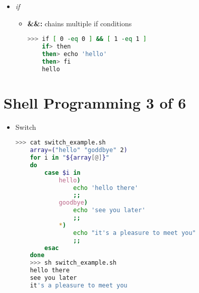 \documentclass[12pt]{article}
\begin{document}
\begin{itemize}
\begin{itemize}
    \end{itemize}

    \item \textit{if}

    \begin{itemize}
    \item \textbf{\&\&:} chains multiple if conditions

    \begin{lstlisting}[language=bash]
    >>> if [ 0 -eq 0 ] && [ 1 -eq 1 ]
    if> then
    then> echo 'hello'
    then> fi
    hello
    \end{lstlisting}
    \end{itemize}

\end{itemize}

\bigskip

\section*{Shell Programming 3 of 6}

\bigskip

\begin{itemize}
    \item Switch

    \begin{lstlisting}[language=bash]
    >>> cat switch_example.sh
    array=("hello" "goddbye" 2)
    for i in "${array[@]}"
    do
        case $i in
            hello)
                echo 'hello there'
                ;;
            goodbye)
                echo 'see you later'
                ;;
            *)
                echo "it's a pleasure to meet you"
                ;;
        esac
    done
    >>> sh switch_example.sh
    hello there
    see you later
    it's a pleasure to meet you
    \end{lstlisting}
\end{itemize}
\end{document}
